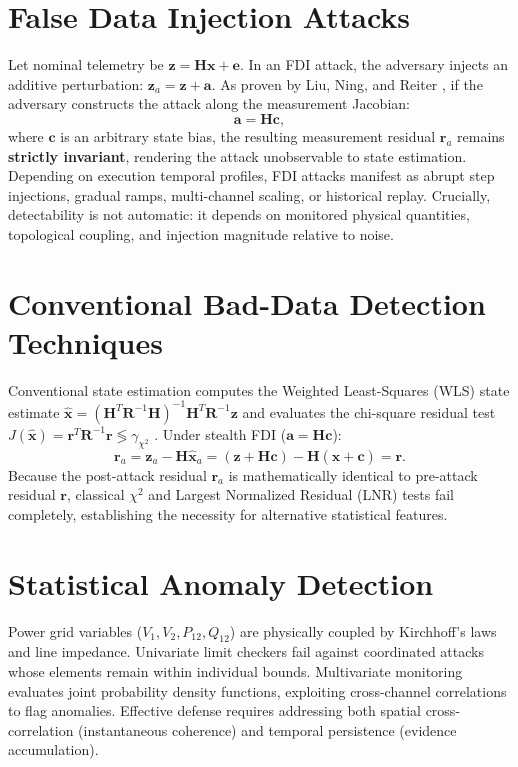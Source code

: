 \documentclass[11pt,a4paper]{report}
\begin{document}
\section{False Data Injection Attacks}
Let nominal telemetry be $\boldsymbol{z} = \boldsymbol{H}\boldsymbol{x} + \boldsymbol{e}$. In an FDI
attack, the adversary injects an additive perturbation: $\boldsymbol{z}_a = \boldsymbol{z} + \boldsymbol{a}$.
As proven by Liu, Ning, and Reiter \cite{liu2009}, if the adversary constructs the attack along the
measurement Jacobian:
\begin{equation}
\boldsymbol{a} = \boldsymbol{H}\boldsymbol{c},
\end{equation}
where $\boldsymbol{c}$ is an arbitrary state bias, the resulting measurement residual $\boldsymbol{r}_a$
remains \textbf{strictly invariant}, rendering the attack unobservable to state estimation.
Depending on execution temporal profiles, FDI attacks manifest as abrupt step injections, gradual
ramps, multi-channel scaling, or historical replay. Crucially, detectability is not automatic: it
depends on monitored physical quantities, topological coupling, and injection magnitude relative to noise.

\section{Conventional Bad-Data Detection Techniques}
Conventional state estimation computes the Weighted Least-Squares (WLS) state estimate
$\hat{\boldsymbol{x}} = (\boldsymbol{H}^T\boldsymbol{R}^{-1}\boldsymbol{H})^{-1}\boldsymbol{H}^T\boldsymbol{R}^{-1}\boldsymbol{z}$
and evaluates the chi-square residual test $J(\hat{\boldsymbol{x}}) = \boldsymbol{r}^T\boldsymbol{R}^{-1}\boldsymbol{r} \lessgtr \gamma_{\chi^2}$
\cite{abur2004}. Under stealth FDI ($\boldsymbol{a} = \boldsymbol{H}\boldsymbol{c}$):
\begin{equation}
\boldsymbol{r}_a = \boldsymbol{z}_a - \boldsymbol{H}\hat{\boldsymbol{x}}_a = (\boldsymbol{z} + \boldsymbol{H}\boldsymbol{c}) - \boldsymbol{H}(\hat{\boldsymbol{x}} + \boldsymbol{c}) = \boldsymbol{r}.
\end{equation}
Because the post-attack residual $\boldsymbol{r}_a$ is mathematically identical to pre-attack
residual $\boldsymbol{r}$, classical $\chi^2$ and Largest Normalized Residual (LNR) tests fail
completely, establishing the necessity for alternative statistical features.

\section{Statistical Anomaly Detection}
Power grid variables ($V_1, V_2, P_{12}, Q_{12}$) are physically coupled by Kirchhoff's laws and line
impedance. Univariate limit checkers fail against coordinated attacks whose elements remain within
individual bounds. Multivariate monitoring evaluates joint probability density functions, exploiting
cross-channel correlations to flag anomalies. Effective defense requires addressing both spatial
cross-correlation (instantaneous coherence) and temporal persistence (evidence accumulation).
\end{document}
